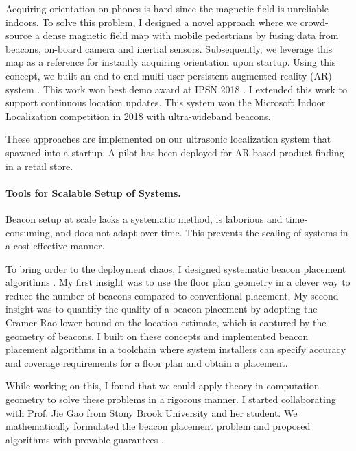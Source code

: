 \documentclass[10pt]{article}
\begin{document}
Acquiring orientation on phones is hard since the magnetic field is unreliable indoors. To solve this problem, 
I designed a novel approach %
where we %
crowd-source a dense magnetic field map with mobile pedestrians by fusing data from beacons, on-board camera and inertial sensors. 
Subsequently, we leverage this map as a reference for instantly acquiring orientation upon startup. %
Using this concept, we built an end-to-end multi-user persistent augmented reality (AR) system \cite{mobileAR}. This work won best demo award at IPSN 2018 \cite{rajagopal2018welcome}. I extended this work to support continuous location updates. This system won the Microsoft Indoor Localization competition in 2018 with ultra-wideband beacons. 

These approaches are implemented on our ultrasonic localization system that spawned into a startup. A pilot has been deployed for AR-based product finding in a retail store. 

\paragraph{Tools for Scalable Setup of Systems.  }
Beacon setup at scale lacks a systematic method, is laborious and time-consuming, and does not adapt over time. This prevents the scaling of systems in a cost-effective manner.

To bring order to the deployment chaos, I designed systematic beacon placement algorithms \cite{rajagopal2016beacon}. 
My first insight was to use the floor plan geometry in a clever way to reduce the number of beacons compared to conventional placement. 
My second insight was to quantify the quality of a beacon placement by adopting the Cramer-Rao lower bound on the location estimate, which is captured by the geometry of beacons. I built on these concepts and implemented beacon placement algorithms in a toolchain where system installers can specify accuracy and coverage requirements for a floor plan and obtain a placement. 

While working on this, I found that we could apply theory in computation geometry to solve these problems in a rigorous manner.  
I started collaborating with Prof. Jie Gao from Stony Brook University and her student. 
We mathematically formulated the beacon placement problem and proposed algorithms with provable guarantees \cite{beaconplacementtheory}.  
\end{document}
